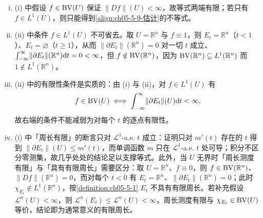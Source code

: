 \documentclass[../../main.tex]{subfiles}%
\begin{document}
\begin{remark}\label{remark:ch05-thm-5-9-条件}
\begin{enumerate}[(i)]
\item (i) 中假设 $f\in\mathrm{BV}(U)$ 保证 $\lVert Df\rVert(U)<\infty$，故等式两端有限；若只有 $f\in L^1(U)$，则只能得到\eqref{align:ch05-5-9-估计}的不等式。%
\item (ii) 中条件 $f\in L^1(U)$ 不可省去。取 $U=\mathbb{R}^n$ 与 $f\equiv1$，则 $E_t=\mathbb{R}^n$（$t<1$）、$E_t=\varnothing$（$t\geqslant1$），从而 $\lVert\partial E_t\rVert(\mathbb{R}^n)=0$ 对一切 $t$ 成立、$\int_{-\infty}^{\infty}\lVert\partial E_t\rVert(\mathbb{R}^n)\mathrm{d} t=0<\infty$，但 $f\notin\mathrm{BV}(\mathbb{R}^n)$，因为 $\mathrm{BV}(\mathbb{R}^n)\subseteq L^1(\mathbb{R}^n)$ 而 $1\notin L^1(\mathbb{R}^n)$。
\item (ii) 中的有限性条件是实质的：由 (i) 与 (ii)，对 $f\in L^1(U)$ 有
\begin{align*}
f\in\mathrm{BV}(U)\iff\int_{-\infty}^{\infty}\lVert\partial E_t\rVert(U)\mathrm{d} t<\infty,
\end{align*}
故右端的条件不能减弱为对每个 $t$ 的逐点有限性。
\item (i) 中「周长有限」的断言只对 $\mathcal{L}^1$-a.e. $t$ 成立：证明只对 $m'(t)$ 存在的 $t$ 得到 $\lVert\partial E_t\rVert(U)\leqslant m'(t)$，而单调函数 $m$ 只在 $\mathcal{L}^1$-a.e. $t$ 处可导；积分不区分零测集，故几乎处处的结论足以支撑等式。此外，当 $U$ 无界时「周长测度有限」与「具有有限周长」需要区分：取 $U=\mathbb{R}^n$、$f\equiv0$，则 $f\in\mathrm{BV}(\mathbb{R}^n)$、$\lVert Df\rVert(\mathbb{R}^n)=0$，而对每个 $t<0$ 有 $E_t=\mathbb{R}^n$、$\lVert\partial E_t\rVert(\mathbb{R}^n)=0$；此时 $\chi_{E_t}\notin L^1(\mathbb{R}^n)$，按\cref{definition:ch05-5-1} $E_t$ 不具有有限周长。若补充假设 $\mathcal{L}^n(U)<\infty$，则 $\mathcal{L}^n(E_t)\leqslant\mathcal{L}^n(U)<\infty$，周长测度有限与 $\chi_{E_t}\in\mathrm{BV}(U)$ 等价，结论即为通常意义的有限周长。%
\end{enumerate}
\end{remark}
\end{document}
